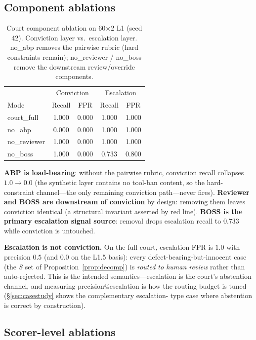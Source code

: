\documentclass[11pt]{article}
\begin{document}
\subsection{Component ablations}\label{sec:courtabl}

\begin{table}[t]
\centering\small
\caption{Court component ablation on 60$\times$2 L1 (seed 42). Conviction
layer vs.\ escalation layer. no\_abp removes the pairwise rubric (hard
constraints remain); no\_reviewer / no\_boss remove the downstream
review/override components.}
\label{tab:courtabl}
\begin{tabular}{@{}lcc|cc@{}}
\toprule
& \multicolumn{2}{c|}{Conviction} & \multicolumn{2}{c}{Escalation} \\
Mode & Recall & FPR & Recall & FPR \\
\midrule
court\_full & 1.000 & 0.000 & 1.000 & 1.000 \\
\;no\_abp & 0.000 & 0.000 & 1.000 & 1.000 \\
\;no\_reviewer & 1.000 & 0.000 & 1.000 & 1.000 \\
\;no\_boss & 1.000 & 0.000 & 0.733 & 0.800 \\
\bottomrule
\end{tabular}
\end{table}

\textbf{ABP is load-bearing}: without the pairwise rubric, conviction recall
collapses $1.0\!\to\!0.0$ (the synthetic layer contains no tool-ban
content, so the hard-constraint channel—the only remaining conviction
path—never fires). \textbf{Reviewer and BOSS are downstream of conviction}
by design: removing them leaves conviction identical (a structural
invariant asserted by red line). \textbf{BOSS is the primary escalation
signal source}: removal drops escalation recall to $0.733$ while conviction
is untouched.

\textbf{Escalation is not conviction.} On the full court, escalation FPR is
$1.0$ with precision $0.5$ (and $0.0$ on the L1.5 basis): every
defect-bearing-but-innocent case (the $S$ set of
Proposition~\ref{prop:decomp}) is \emph{routed to human review} rather than
auto-rejected. This is the intended semantics—escalation is the court's
abstention channel, and measuring precision@escalation is how the routing
budget is tuned (\S\ref{sec:casestudy} shows the complementary escalation-
type case where abstention is correct by construction).

\subsection{Scorer-level ablations}\label{sec:scorerabl}
\end{document}
